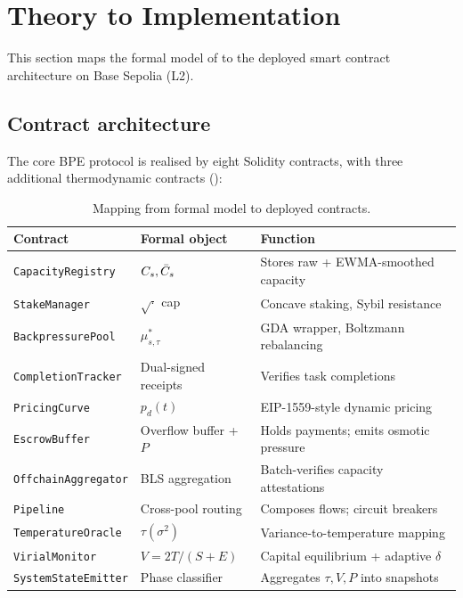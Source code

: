 \section{Theory to Implementation}
\label{sec:implementation}

This section maps the formal model of 
to the deployed smart contract architecture on Base Sepolia (L2).

\subsection{Contract architecture}

The core BPE protocol is realised by eight Solidity contracts,
with three additional thermodynamic contracts ():

\begin{table}[h]
\centering
\small
\begin{tabular}{lll}
\toprule
\textbf{Contract} & \textbf{Formal object} & \textbf{Function} \\
\midrule
\texttt{CapacityRegistry} & $C_s, \bar{C}_s$ & Stores raw + EWMA-smoothed capacity \\
\texttt{StakeManager} & $\sqrt{\cdot}$ cap & Concave staking, Sybil resistance \\
\texttt{BackpressurePool} & $\mu^*_{s,\tau}$ & GDA wrapper, Boltzmann rebalancing \\
\texttt{CompletionTracker} & Dual-signed receipts & Verifies task completions \\
\texttt{PricingCurve} & $p_d(t)$ & EIP-1559-style dynamic pricing \\
\texttt{EscrowBuffer} & Overflow buffer + $P$ & Holds payments; emits osmotic pressure \\
\texttt{OffchainAggregator} & BLS aggregation & Batch-verifies capacity attestations \\
\texttt{Pipeline} & Cross-pool routing & Composes flows; circuit breakers \\
\midrule
\texttt{TemperatureOracle} & $\tau(\sigma^2)$ & Variance-to-temperature mapping \\
\texttt{VirialMonitor} & $V = 2T/(S+E)$ & Capital equilibrium + adaptive $\delta$ \\
\texttt{SystemStateEmitter} & Phase classifier & Aggregates $\tau, V, P$ into snapshots \\
\bottomrule
\end{tabular}
\caption{Mapping from formal model to deployed contracts.}
\label{tab:contract-map}
\end{table}

